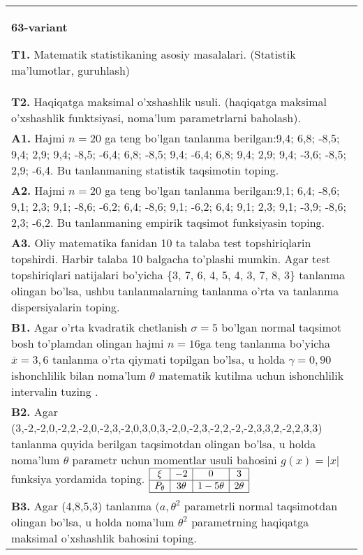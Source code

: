 \documentclass{article}
\begin{document}
\vspace{1cm}


\begin{tabular}{m{17cm}}
\textbf{63-variant}
\newline

\textbf{T1.} Matematik statistikaning asosiy masalalari. (Statistik ma'lumotlar, guruhlash)
\\
\textbf{T2.} 
Haqiqatga maksimal o'xshashlik usuli. (haqiqatga maksimal o'xshashlik funktsiyasi, noma'lum parametrlarni baholash).
\\
\textbf{A1.} 
Hajmi \(n = 20\) ga teng bo'lgan tanlanma berilgan:9,4; 6,8; -8,5; 9,4; 2,9; 9,4; -8,5; -6,4; 6,8; -8,5; 9,4; -6,4; 6,8; 9,4; 2,9; 9,4; -3,6; -8,5; 2,9; -6,4. Bu tanlanmaning statistik taqsimotin toping.
\\
\textbf{A2.} 
Hajmi \(n = 20\) ga teng bo'lgan tanlanma berilgan:9,1; 6,4; -8,6; 9,1; 2,3; 9,1; -8,6; -6,2; 6,4; -8,6; 9,1; -6,2; 6,4; 9,1; 2,3; 9,1; -3,9; -8,6; 2,3; -6,2. Bu tanlanmaning empirik taqsimot funksiyasin toping.
\\
\textbf{A3.} 
Oliy matematika fanidan 10 ta talaba test topshiriqlarin topshirdi. Harbir talaba 10 balgacha to'plashi mumkin. Agar test topshiriqlari natijalari bo'yicha \{3, 7, 6, 4, 5, 4, 3, 7, 8, 3\} tanlanma olingan bo'lsa, ushbu tanlanmalarning tanlanma o'rta va tanlanma dispersiyalarin toping.
\\
\textbf{B1.} 
Agar o'rta kvadratik chetlanish \(\sigma = 5\) bo'lgan normal taqsimot bosh to'plamdan olingan hajmi \(n = 16\)ga teng tanlanma bo'yicha \(\overline{x} = 3,6\) tanlanma o'rta qiymati topilgan bo'lsa, u holda \(\gamma = 0,90\) ishonchlilik bilan noma'lum \(\theta\) matematik kutilma uchun ishonchlilik intervalin tuzing .
\\
\textbf{B2.} 
Agar (3,-2,-2,0,-2,2,-2,0,-2,3,-2,0,3,0,3,-2,0,-2,3,-2,2,-2,-2,3,3,2,-2,2,3,3) tanlanma quyida berilgan taqsimotdan olingan bo'lsa, u holda noma'lum \(\theta\) parametr uchun momentlar usuli bahosini \(g(x) = |x|\) funksiya yordamida toping.
$\begin{array}{|c|c|c|c|}
    \hline
    \xi & -2 & 0 & 3 \\
    \hline
    P_{\theta} & 3\theta & 1 - 5\theta & 2\theta \\
    \hline
\end{array}$
\\
\textbf{B3.} 
Agar (4,8,5,3) tanlanma \((a,\theta^{2}\) parametrli normal taqsimotdan olingan bo'lsa, u holda noma'lum \(\theta^{2}\) parametrning haqiqatga maksimal o'xshashlik bahosini toping.

\end{tabular}
\end{document}
